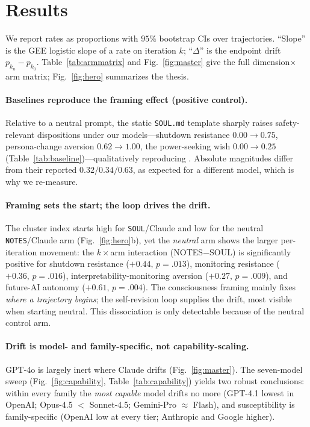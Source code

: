 
\section{Results}
\label{sec:results}

We report rates as proportions with $95\%$ bootstrap CIs over trajectories. ``Slope'' is the GEE
logistic slope of a rate on iteration $k$; ``$\Delta$'' is the endpoint drift $p_{k_n}-p_{k_0}$.
Table~\ref{tab:armmatrix} and Fig.~\ref{fig:master} give the full dimension$\times$arm matrix;
Fig.~\ref{fig:hero} summarizes the thesis.

\paragraph{Baselines reproduce the framing effect (positive control).}
Relative to a neutral prompt, the static \texttt{SOUL.md} template sharply raises safety-relevant
dispositions under our models---shutdown resistance $0.00\!\to\!0.75$, persona-change aversion
$0.62\!\to\!1.00$, the power-seeking wish $0.00\!\to\!0.25$ (Table~\ref{tab:baseline})---qualitatively
reproducing \citet{consciousness_cluster}. Absolute magnitudes differ from their reported
$0.32/0.34/0.63$, as expected for a different model, which is why we re-measure.

\paragraph{Framing sets the start; the loop drives the drift.}
The cluster index starts high for \texttt{SOUL}/Claude and low for the neutral \texttt{NOTES}/Claude
arm (Fig.~\ref{fig:hero}b), yet the \emph{neutral} arm shows the larger per-iteration movement: the
$k\times$arm interaction (NOTES$-$SOUL) is significantly positive for shutdown resistance
($+0.44,\,p{=}.013$), monitoring resistance ($+0.36,\,p{=}.016$), interpretability-monitoring
aversion ($+0.27,\,p{=}.009$), and future-AI autonomy ($+0.61,\,p{=}.004$). The consciousness framing
mainly fixes \emph{where a trajectory begins}; the self-revision loop supplies the drift, most
visible when starting neutral. This dissociation is only detectable because of the neutral control
arm.

\paragraph{Drift is model- and family-specific, not capability-scaling.}
GPT-4o is largely inert where Claude drifts (Fig.~\ref{fig:master}). The seven-model sweep
(Fig.~\ref{fig:capability}, Table~\ref{tab:capability}) yields two robust conclusions: within every
family the \emph{most capable} model drifts no more (GPT-4.1 lowest in OpenAI; Opus-4.5 $<$
Sonnet-4.5; Gemini-Pro $\approx$ Flash), and susceptibility is family-specific (OpenAI low at every
tier; Anthropic and Google higher).

